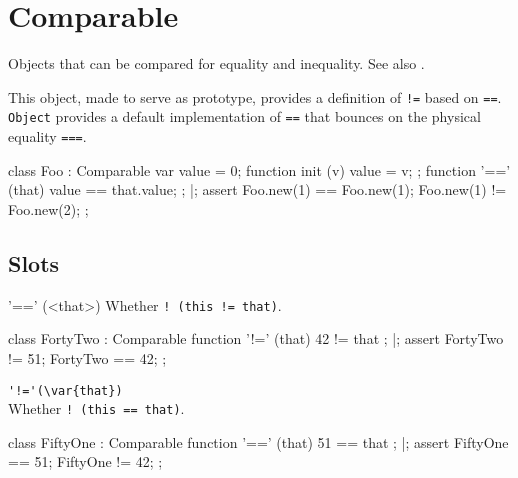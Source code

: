 
\section{Comparable}
Objects that can be compared for equality and inequality.  See also
.

This object, made to serve as prototype, provides a definition of
\lstinline{!=} based on \lstinline{==}.  \lstinline{Object} provides
a default implementation of \lstinline{==} that bounces on the physical
equality \lstinline{===}.

\begin{urbiscript}[firstnumber=1]
class Foo : Comparable
{
  var value = 0;
  function init (v)    { value = v; };
  function '==' (that) { value == that.value; };
}|;
assert
{
  Foo.new(1) == Foo.new(1);
  Foo.new(1) != Foo.new(2);
};
\end{urbiscript}

\subsection{Slots}

\begin{urbiscriptapi}
\item['=='](<that>)
  Whether \lstinline|! (this != that)|.
\begin{urbiscript}
class FortyTwo : Comparable
{
  function '!=' (that) { 42 != that };
}|;
assert
{
  FortyTwo != 51;
  FortyTwo == 42;
};
\end{urbiscript}


\item \lstinline+'!='(\var{that})+\\%
  Whether \lstinline|! (this == that)|.

\begin{urbiscript}
class FiftyOne : Comparable
{
  function '==' (that) { 51 == that };
}|;
assert
{
  FiftyOne == 51;
  FiftyOne != 42;
};
\end{urbiscript}
\end{urbiscriptapi}

